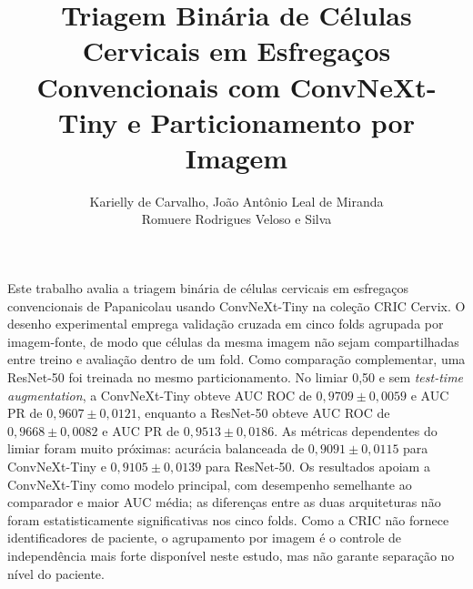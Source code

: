\documentclass[12pt]{article}
\title{Triagem Binária de Células Cervicais em Esfregaços Convencionais
com ConvNeXt-Tiny e Particionamento por Imagem}
\author{Karielly de Carvalho\inst{1}, João Antônio Leal de Miranda\inst{1}\\
Romuere Rodrigues Veloso e Silva\inst{1}}
\begin{document}
\maketitle

\begin{resumo}
Este trabalho avalia a triagem binária de células cervicais em esfregaços
convencionais de Papanicolau usando ConvNeXt-Tiny na coleção CRIC Cervix. O
desenho experimental emprega validação cruzada em cinco folds agrupada por
imagem-fonte, de modo que células da mesma imagem não sejam compartilhadas
entre treino e avaliação dentro de um fold. Como comparação complementar, uma
ResNet-50 foi treinada no mesmo particionamento. No limiar 0,50 e sem
\emph{test-time augmentation}, a ConvNeXt-Tiny obteve AUC ROC de
$0{,}9709\pm0{,}0059$ e AUC PR de $0{,}9607\pm0{,}0121$, enquanto a ResNet-50
obteve AUC ROC de $0{,}9668\pm0{,}0082$ e AUC PR de $0{,}9513\pm0{,}0186$.
As métricas dependentes do limiar foram muito próximas: acurácia balanceada de
$0{,}9091\pm0{,}0115$ para ConvNeXt-Tiny e $0{,}9105\pm0{,}0139$ para ResNet-50.
Os resultados apoiam a ConvNeXt-Tiny como modelo principal, com desempenho
semelhante ao comparador e maior AUC média; as diferenças entre as duas
arquiteturas não foram estatisticamente significativas nos cinco folds. Como a CRIC não fornece
identificadores de paciente, o agrupamento por imagem é o controle de
independência mais forte disponível neste estudo, mas não garante separação no
nível do paciente.
\end{resumo}









\end{document}
